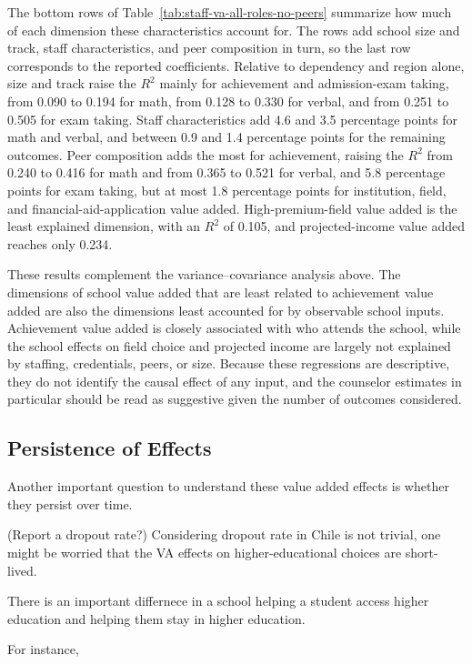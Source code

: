 \documentclass[a4paper, article, english, oneside, unknownkeysallowed, 12pt]{memoir}
\begin{document}
The bottom rows of Table~\ref{tab:staff-va-all-roles-no-peers} summarize how much of each dimension these characteristics account for.
The rows add school size and track, staff characteristics, and peer composition in turn, so the last row corresponds to the reported coefficients.
Relative to dependency and region alone, size and track raise the $R^2$ mainly for achievement and admission-exam taking, from 0.090 to 0.194 for math, from 0.128 to 0.330 for verbal, and from 0.251 to 0.505 for exam taking.
Staff characteristics add 4.6 and 3.5 percentage points for math and verbal, and between 0.9 and 1.4 percentage points for the remaining outcomes.
Peer composition adds the most for achievement, raising the $R^2$ from 0.240 to 0.416 for math and from 0.365 to 0.521 for verbal, and 5.8 percentage points for exam taking, but at most 1.8 percentage points for institution, field, and financial-aid-application value added.
High-premium-field value added is the least explained dimension, with an $R^2$ of 0.105, and projected-income value added reaches only 0.234.


These results complement the variance--covariance analysis above.
The dimensions of school value added that are least related to achievement value added are also the dimensions least accounted for by observable school inputs.
Achievement value added is closely associated with who attends the school, while the school effects on field choice and projected income are largely not explained by staffing, credentials, peers, or size.
Because these regressions are descriptive, they do not identify the causal effect of any input, and the counselor estimates in particular should be read as suggestive given the number of outcomes considered.


\subsection{Persistence of Effects}

Another important question to understand these value added effects is whether they persist over time.

(Report a dropout rate?)
Considering dropout rate in Chile is not trivial, one might be worried that the VA effects on higher-educational choices are short-lived.

There is an important differnece in a school helping a student access higher education and helping them stay in higher education.

For instance, 
\end{document}
